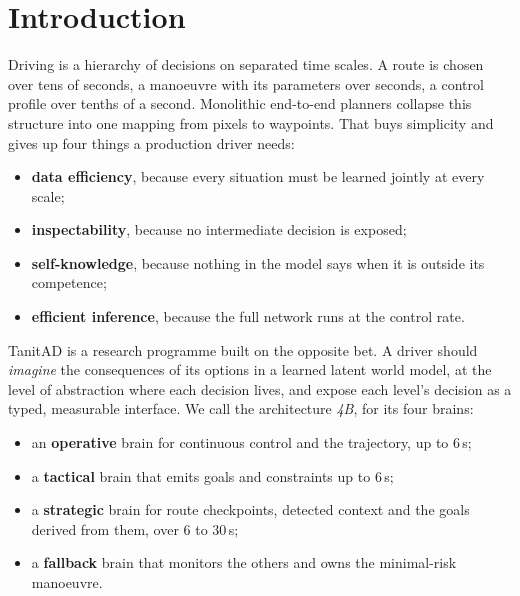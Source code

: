 \documentclass[10pt,twocolumn]{article}
\theoremstyle{remark}
\begin{document}
\begin{abstract}
doctrine built for decisions rather than leaderboards: pre-registered bars with both outcomes committed, episode-cluster bootstrap
intervals, explicit seed variance and four metric families on every evaluation. We close with the remaining frontier (assertive
launch from standstill), the re-rendered simulation tier built to address it, and a research roadmap toward a 4B driver within a
budget of at most 800\,M parameters, deployable within 100\,ms on an edge computer.
\end{abstract}

\section{Introduction}
Driving is a hierarchy of decisions on separated time scales. A route is chosen over tens of seconds, a manoeuvre with its
parameters over seconds, a control profile over tenths of a second. Monolithic end-to-end planners collapse this structure into one
mapping from pixels to waypoints. That buys simplicity and gives up four things a production driver needs:
\begin{itemize}
  \item \textbf{data efficiency}, because every situation must be learned jointly at every scale;
  \item \textbf{inspectability}, because no intermediate decision is exposed;
  \item \textbf{self-knowledge}, because nothing in the model says when it is outside its competence;
  \item \textbf{efficient inference}, because the full network runs at the control rate.
\end{itemize}

TanitAD is a research programme built on the opposite bet. A driver should \emph{imagine} the consequences of its options in a
learned latent world model, at the level of abstraction where each decision lives, and expose each level's decision as a typed,
measurable interface. We call the architecture \emph{4B}, for its four brains:
\begin{itemize}
  \item an \textbf{operative} brain for continuous control and the trajectory, up to 6\,s;
  \item a \textbf{tactical} brain that emits goals and constraints up to 6\,s;
  \item a \textbf{strategic} brain for route checkpoints, detected context and the goals derived from them, over 6 to 30\,s;
  \item a \textbf{fallback} brain that monitors the others and owns the minimal-risk manoeuvre.
\end{itemize}
\end{document}
